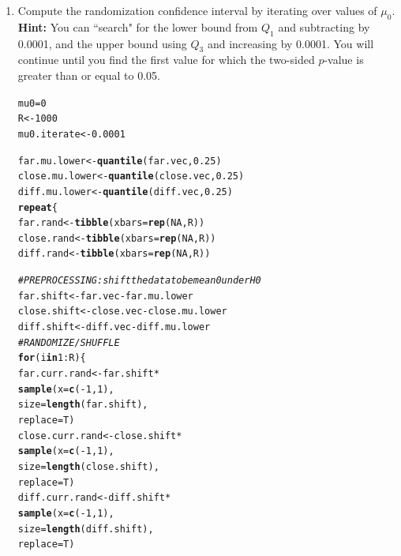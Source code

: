 \documentclass{article}\usepackage[]{graphicx}\usepackage[]{xcolor}
\makeatletter
\newcommand{\hlnum}[1]{\textcolor[rgb]{0.686,0.059,0.569}{#1}}%
\newcommand{\hlcom}[1]{\textcolor[rgb]{0.678,0.584,0.686}{\textit{#1}}}%
\newcommand{\hlopt}[1]{\textcolor[rgb]{0,0,0}{#1}}%
\newcommand{\hldef}[1]{\textcolor[rgb]{0.345,0.345,0.345}{#1}}%
\newcommand{\hlkwa}[1]{\textcolor[rgb]{0.161,0.373,0.58}{\textbf{#1}}}%
\newcommand{\hlkwb}[1]{\textcolor[rgb]{0.69,0.353,0.396}{#1}}%
\newcommand{\hlkwc}[1]{\textcolor[rgb]{0.333,0.667,0.333}{#1}}%
\newcommand{\hlkwd}[1]{\textcolor[rgb]{0.737,0.353,0.396}{\textbf{#1}}}%
\newenvironment{kframe}{%
 \def\at@end@of@kframe{}%
 \ifinner\ifhmode%
  \def\at@end@of@kframe{\end{minipage}}%
  \begin{minipage}{\columnwidth}%
 \fi\fi%
 \def\FrameCommand##1{\hskip\@totalleftmargin \hskip-\fboxsep
 \colorbox{shadecolor}{##1}\hskip-\fboxsep
     \hskip-\linewidth \hskip-\@totalleftmargin \hskip\columnwidth}%
 \MakeFramed {\advance\hsize-\width
   \@totalleftmargin\z@ \linewidth\hsize
   \@setminipage}}%
 {\par\unskip\endMakeFramed%
 \at@end@of@kframe}
\newenvironment{knitrout}{}{} %
\makeatother
\begin{document}
\begin{enumerate}
\begin{enumerate}
  \item Compute the randomization confidence interval by iterating over values of $\mu_0$.\\
  \textbf{Hint:} You can ``search" for the lower bound from $Q_1$ and subtracting by 0.0001, 
  and the upper bound using $Q_3$ and increasing by 0.0001. You will continue until you find 
  the first value for which the two-sided $p$-value is greater than or equal to 0.05.
\begin{knitrout}
\color{fgcolor}\begin{kframe}
\begin{alltt}
\hldef{mu0} \hlkwb{=} \hlnum{0}
\hldef{R} \hlkwb{<-} \hlnum{1000}
\hldef{mu0.iterate} \hlkwb{<-} \hlnum{0.0001}

\hldef{far.mu.lower} \hlkwb{<-} \hlkwd{quantile}\hldef{(far.vec,} \hlnum{0.25}\hldef{)}
\hldef{close.mu.lower} \hlkwb{<-} \hlkwd{quantile}\hldef{(close.vec,} \hlnum{0.25}\hldef{)}
\hldef{diff.mu.lower} \hlkwb{<-} \hlkwd{quantile}\hldef{(diff.vec,} \hlnum{0.25}\hldef{)}
\hlkwa{repeat}\hldef{\{}
  \hldef{far.rand} \hlkwb{<-} \hlkwd{tibble}\hldef{(}\hlkwc{xbars} \hldef{=} \hlkwd{rep}\hldef{(}\hlnum{NA}\hldef{, R))}
  \hldef{close.rand} \hlkwb{<-} \hlkwd{tibble}\hldef{(}\hlkwc{xbars} \hldef{=} \hlkwd{rep}\hldef{(}\hlnum{NA}\hldef{, R))}
  \hldef{diff.rand} \hlkwb{<-} \hlkwd{tibble}\hldef{(}\hlkwc{xbars} \hldef{=} \hlkwd{rep}\hldef{(}\hlnum{NA}\hldef{, R))}

  \hlcom{# PREPROCESSING: shift the data to be mean 0 under H0}
  \hldef{far.shift} \hlkwb{<-} \hldef{far.vec} \hlopt{-} \hldef{far.mu.lower}
  \hldef{close.shift} \hlkwb{<-} \hldef{close.vec} \hlopt{-} \hldef{close.mu.lower}
  \hldef{diff.shift} \hlkwb{<-} \hldef{diff.vec} \hlopt{-} \hldef{diff.mu.lower}
  \hlcom{# RANDOMIZE / SHUFFLE}
  \hlkwa{for}\hldef{(i} \hlkwa{in} \hlnum{1}\hlopt{:}\hldef{R)\{}
    \hldef{far.curr.rand} \hlkwb{<-} \hldef{far.shift} \hlopt{*}
      \hlkwd{sample}\hldef{(}\hlkwc{x} \hldef{=} \hlkwd{c}\hldef{(}\hlopt{-}\hlnum{1}\hldef{,} \hlnum{1}\hldef{),}
             \hlkwc{size} \hldef{=} \hlkwd{length}\hldef{(far.shift),}
             \hlkwc{replace} \hldef{= T)}
    \hldef{close.curr.rand} \hlkwb{<-} \hldef{close.shift} \hlopt{*}
      \hlkwd{sample}\hldef{(}\hlkwc{x} \hldef{=} \hlkwd{c}\hldef{(}\hlopt{-}\hlnum{1}\hldef{,} \hlnum{1}\hldef{),}
             \hlkwc{size} \hldef{=} \hlkwd{length}\hldef{(close.shift),}
             \hlkwc{replace} \hldef{= T)}
    \hldef{diff.curr.rand} \hlkwb{<-} \hldef{diff.shift} \hlopt{*}
      \hlkwd{sample}\hldef{(}\hlkwc{x} \hldef{=} \hlkwd{c}\hldef{(}\hlopt{-}\hlnum{1}\hldef{,} \hlnum{1}\hldef{),}
             \hlkwc{size} \hldef{=} \hlkwd{length}\hldef{(diff.shift),}
             \hlkwc{replace} \hldef{= T)}


\end{alltt}
\end{kframe}
\end{knitrout}
\end{enumerate}
\end{enumerate}
\end{document}
